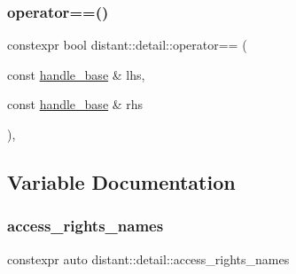 \mbox{\label{namespacedistant_1_1detail_aa460c2625dfa826f49513781c99514f8}} 
\subsubsection{\texorpdfstring{operator==()}{operator==()}}
{\footnotesize\ttfamily constexpr bool distant\+::detail\+::operator== (\begin{DoxyParamCaption}\item[{const \mbox{\hyperlink{classdistant_1_1detail_1_1handle__base}{handle\+\_\+base}} \&}]{lhs,  }\item[{const \mbox{\hyperlink{classdistant_1_1detail_1_1handle__base}{handle\+\_\+base}} \&}]{rhs }\end{DoxyParamCaption})\hspace{0.3cm}{\ttfamily [inline]}, {\ttfamily [noexcept]}}



\subsection{Variable Documentation}
\mbox{\label{namespacedistant_1_1detail_a0ce94debf8f2816a9adaf6c49119f6a9}} 
\subsubsection{\texorpdfstring{access\+\_\+rights\+\_\+names}{access\_rights\_names}}
{\footnotesize\ttfamily constexpr auto distant\+::detail\+::access\+\_\+rights\+\_\+names}

